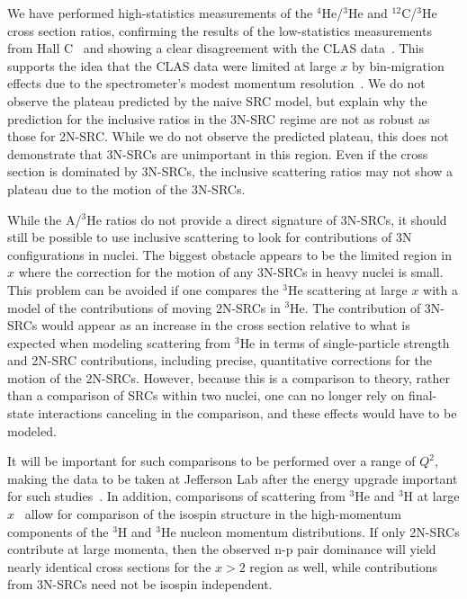 \documentclass[aps,prl,superscriptaddress,showpacs,twocolumn,floatfix,amsmath,amssymb]{revtex4-1}
\begin{document}
%
We have performed high-statistics measurements of the $^4$He/$^3$He and $^{12}$C/$^3$He cross section
ratios, confirming the results of the low-statistics measurements from Hall C~\cite{fomin2012} and showing
a clear disagreement with the CLAS data~\cite{PhysRevLett.96.082501}. This supports the idea that the CLAS
data were limited at large $x$ by bin-migration effects due to the spectrometer's modest momentum
resolution~\cite{Higinbotham:2014xna}. We do not observe the plateau predicted by the naive SRC model, but
explain why the prediction for the inclusive ratios in the 3N-SRC regime are not as robust as those for
2N-SRC. While we do not observe the predicted plateau, this does not demonstrate that 3N-SRCs are
unimportant in this region. Even if the cross section is dominated by 3N-SRCs, the inclusive scattering
ratios may not show a plateau due to the motion of the 3N-SRCs.

While the A/$^3$He ratios do not provide a direct signature of 3N-SRCs, it should still be possible to use
inclusive scattering to look for contributions of 3N configurations in nuclei. The biggest obstacle appears
to be the limited region in $x$ where the correction for the motion of any 3N-SRCs in heavy nuclei is small.
This problem can be avoided if one compares the $^3$He scattering at large $x$ with a model of the
contributions of moving 2N-SRCs in $^3$He. The contribution of 3N-SRCs would appear as an increase in the
cross section relative to what is expected when modeling scattering from $^3$He in terms of single-particle
strength and 2N-SRC contributions, including precise, quantitative corrections for the motion of the
2N-SRCs. However, because this is a comparison to theory, rather than a comparison of SRCs within two
nuclei, one can no longer rely on final-state interactions canceling in the comparison, and these effects
would have to be modeled.

It will be important for such comparisons to be performed over a range of $Q^2$, making the data to be taken
at Jefferson Lab after the energy upgrade important for such studies~\cite{e1206105}. In addition,
comparisons of scattering from $^3$He and $^3$H at large $x$~\cite{e1211112} allow for comparison of the
isospin structure in the high-momentum components of the $^3$H and $^3$He nucleon momentum distributions. If
only 2N-SRCs contribute at large momenta, then the observed n-p pair dominance will yield nearly identical
cross sections for the $x>2$ region as well, while contributions from 3N-SRCs need not be isospin independent.
\end{document}
